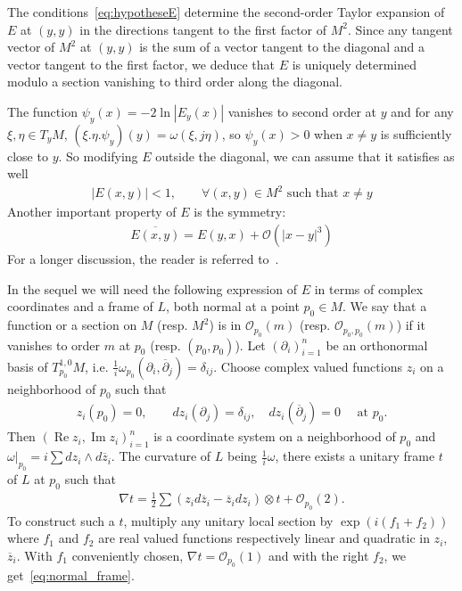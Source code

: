 \documentclass[10pt,a4paper]{article}
\theoremstyle{definition}
\numberwithin{equation}{section}
\newcommand{\om}{{\omega}}
\newcommand{\con}{\overline}
\newcommand{\op}{\operatorname}
\newcommand{\bigo}{\mathcal{O}}
\let\oldforall\forall
\renewcommand*{\forall}{\mathrel{\oldforall}}
\begin{document}
The conditions~\eqref{eq:hypotheseE} determine the second-order Taylor expansion of $E$ at $(y,y)$ in the directions tangent to the first factor of $M^2$. Since any tangent vector of $M^2$ at $(y,y)$ is the sum of a vector tangent to the diagonal and a vector tangent to the first factor, we deduce that $E$ is uniquely determined modulo a section vanishing to third order along the diagonal.

The function $\psi_y (x)= - 2 \ln |E_y (x)|$ vanishes to second order at $y$ and for any $\xi, \eta \in T_yM$, $(\xi.\eta. \psi_y)(y) = \om (\xi, j \eta)$, so $\psi_y(x)>0$ when $x\neq y$ is sufficiently close to $y$. So modifying $E$ outside the diagonal, we can assume that it satisfies as well
\begin{gather}\label{eq:normE}
|E (x,y) | <1, \qquad \forall (x,y) \in M^2 \text{ such that } x \neq y
\end{gather}
Another important property of $E$ is the symmetry:
\begin{gather}\label{eq:symE}
\con{E (x,y)} = E(y,x) +
\bigo \left(|x-y|^3\right)
\end{gather}
For a longer discussion, the reader is referred to~\cite{oim}.

In the sequel we will need the following expression of $E$ in terms of complex coordinates and a frame of $L$, both normal at a point $p_0 \in M$.  We say that a function or a section on $M$ (resp. $M^2$) is in $\bigo_{p_0} (m)$ (resp. $\bigo_{p_0, p_0} (m)$) if it vanishes to order $m$ at $p_0$ (resp. $(p_0,p_0)$).  Let $(\partial_i)_{i =1}^{n}$ be an orthonormal basis of $T^{1,0}_{p_0} M$, i.e. $\frac{1}{i}\om_{p_0} (\partial_i, \con{\partial}_j) = \delta_{ij}$. Choose complex valued functions $z_i$ on a neighborhood of $p_0$ such that
\begin{gather}\label{eq:coordonnees_z}
z_i (p_0) =0, \qquad dz_i (\partial_j) =\delta_{ij}, \quad dz_i (\con \partial_j) = 0 \quad
\text{ at }p_0.
\end{gather}
Then $(\op{Re} z_i, \op{Im}z_i)_{i=1}^n$ is a coordinate system on a neighborhood of $p_0$ and $\om|_{p_0} = i \sum dz_i \wedge d\con{z}_i$. The curvature of $L$ being $\frac{1}{i} \om$, there exists a unitary frame $t$ of $L$ at $p_0$ such that
\begin{gather}\label{eq:normal_frame}
\nabla t = \tfrac{1}{2} \textstyle{\sum} (z_i d \con{z}_i - \con{z}_i d z_i) \otimes t + \bigo_{p_0} (2).
\end{gather}
To construct such a $t$, multiply any unitary local section by $\exp (i (f_1 + f_2))$ where $f_1$ and $f_2$ are real valued functions respectively linear and quadratic in $z_i$, $\con{z}_i$. With $f_1$ conveniently chosen, $\nabla t = \bigo_{p_0} (1)$ and with the right $f_2$, we get~\eqref{eq:normal_frame}. 
\end{document}
